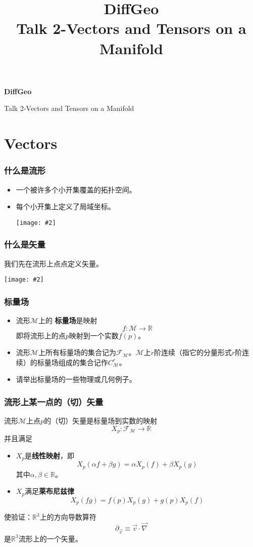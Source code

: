 \documentclass[CJK]{beamer}
\title{DiffGeo\\ Talk 2-Vectors and Tensors on a Manifold}
\author{}
\date{}
\newcommand{\field}{\mathscr{F}}
\newcommand{\reals}{\mathbb{R}}
\newcommand{\mani}{\mathcal{M}}
\newcommand{\cpic}[2]{
\begin{center}
\texttt{[image: \#2]}
\end{center}
}
\begin{document}
\begin{frame}
 
\begin{center}
\begin{Large}
\bch
{\bf DiffGeo}

{\vskip 0.3in}

Talk 2-Vectors and Tensors on a Manifold

\ech
\end{Large}
\end{center}


\end{frame}

\section{Vectors}
\begin{frame}
\frametitle{\bch 什么是流形 \ech}
\bch
\begin{itemize}
\item
一个被许多个小开集覆盖的拓扑空间。
\item
每个小开集上定义了局域坐标。
\cpic{0.15}{ok}
\end{itemize}
\ech
\end{frame}

\begin{frame}
\frametitle{\bch 什么是矢量 \ech}
\bch
我们先在流形上点点定义矢量。
\cpic{0.2}{happy}
\ech
\end{frame}

\begin{frame}
\frametitle{\bch 标量场 \ech}
\bch
\begin{itemize}
\item
流形$\mani$上的{\bf \color{purple} 标量场}是映射
$$
f: \mani \to \reals
$$
即将流形上的点$p$映射到一个实数$f(p)$。
\item
流形$\mani$上所有标量场的集合记为$\field_\mani$。$\mani$上$r$阶连续（指它的分量形式$r$阶连续）的标量场组成的集合记作$C^r_\mani$。
\item
请举出标量场的一些物理或几何例子。
\end{itemize}

\ech
\end{frame}


\begin{frame}
\frametitle{\bch 流形上某一点的（切）矢量 \ech}
\bch

流形$\mani$上点$p$的（切）矢量是标量场到实数的映射
$$
X_p: \field_\mani \to \reals
$$
并且满足
\begin{itemize}
\item
$X_p$是{\bf 线性映射}，即
$$
X_p(\alpha f + \beta g) = \alpha X_p(f) + \beta X_p(g)
$$
其中$\alpha,\beta \in \reals$。
\item
$X_p$满足{\bf 莱布尼兹律}{\color{blue}
$$
X_p(fg) = f(p) X_p(g) + g(p) X_p(f)
$$}
\end{itemize}
使验证：$\reals^3$上的方向导数算符$$\partial_{\vec v} \equiv \vec v \cdot \vec \nabla $$是$\reals^3$流形上的一个矢量。

\ech
\end{frame}
\end{document}
